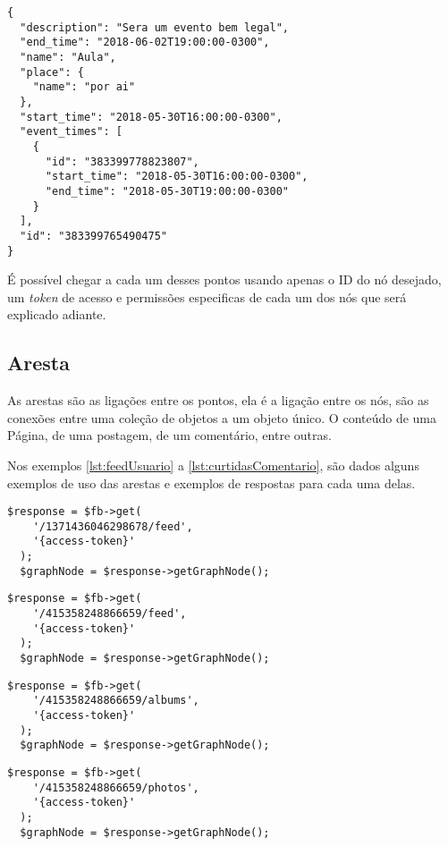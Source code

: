 \begin{lstlisting}[caption={Resposta do servidor a uma requisição \ref{lst:evento}},label={lst:retornoEvento}]
{
  "description": "Sera um evento bem legal",
  "end_time": "2018-06-02T19:00:00-0300",
  "name": "Aula",
  "place": {
    "name": "por ai"
  },
  "start_time": "2018-05-30T16:00:00-0300",
  "event_times": [
    {
      "id": "383399778823807",
      "start_time": "2018-05-30T16:00:00-0300",
      "end_time": "2018-05-30T19:00:00-0300"
    }
  ],
  "id": "383399765490475"
}
\end{lstlisting}

É possível chegar a cada um desses pontos usando apenas o ID do nó desejado, um \textit{token} de acesso e permissões especificas de cada um dos nós que será explicado adiante.

\subsection{Aresta}
As arestas são as ligações entre os pontos, ela é a ligação entre os nós, são as conexões entre uma coleção de objetos a um objeto único. O conteúdo de uma Página, de uma postagem, de um comentário, entre outras.

Nos exemplos \ref{lst:feedUsuario} a \ref{lst:curtidasComentario}, são dados alguns exemplos de uso das arestas e exemplos de respostas para cada uma delas.

\begin{lstlisting}[caption={Requisitando todas as publicações de um usuário},label={lst:feedUsuario}]
  $response = $fb->get( 
    '/1371436046298678/feed', 
    '{access-token}'
  );
  $graphNode = $response->getGraphNode();
\end{lstlisting}

\begin{lstlisting}[caption={Requisitando todas as publicações de uma página},label={lst:feedPagina}]
  $response = $fb->get( 
    '/415358248866659/feed', 
    '{access-token}'
  );
  $graphNode = $response->getGraphNode();
\end{lstlisting}

\begin{lstlisting}[caption={Requisitar todos os álbuns de uma página},label={lst:albumPagina}]
  $response = $fb->get( 
    '/415358248866659/albums', 
    '{access-token}'
  );
  $graphNode = $response->getGraphNode();
\end{lstlisting}

\begin{lstlisting}[caption={Requisitar as fotos de perfil publicadas na página},label={lst:fotoPagina}]
  $response = $fb->get( 
    '/415358248866659/photos', 
    '{access-token}'
  );
  $graphNode = $response->getGraphNode();
\end{lstlisting}

